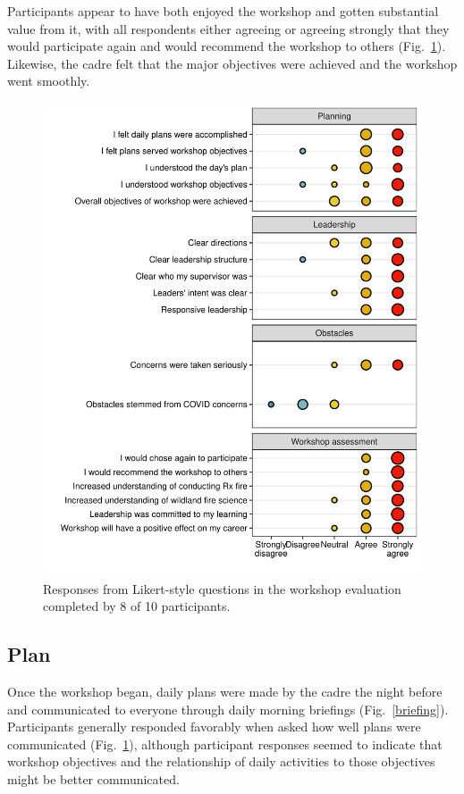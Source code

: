 \documentclass[fire,article,submit,moreauthors,pdftex]{Definitions/mdpi}
\begin{document}
Participants appear to have both enjoyed the workshop and gotten substantial value from it, with all respondents either agreeing or agreeing strongly that they would participate again and would recommend the workshop to others (Fig.~\ref{likert}).
Likewise, the cadre felt that the major objectives were achieved and the workshop went smoothly.

\begin{figure}
\centering
\includegraphics[width=1\columnwidth]{likert_gg-1.pdf}
\caption{Responses from Likert-style questions in the workshop evaluation completed by 8 of 10 participants. \label{likert}}
\end{figure}

\subsection{Plan}

Once the workshop began, daily plans were made by the cadre the night before and communicated to everyone through daily morning briefings (Fig.~\ref{briefing}).
Participants generally responded favorably when asked how well plans were communicated (Fig.~\ref{likert}), although participant responses seemed to indicate that workshop objectives and the relationship of daily activities to those objectives might be better communicated.
\end{document}
